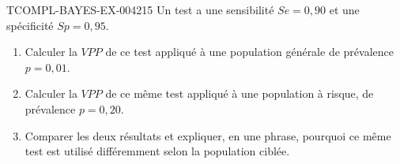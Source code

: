 \begin{exercice}{TCOMPL-BAYES-EX-004}{2}{15}
Un test a une sensibilité $Se=0{,}90$ et une spécificité $Sp=0{,}95$.
\begin{enumerate}
  \item Calculer la $VPP$ de ce test appliqué à une population générale de prévalence $p=0{,}01$.
  \item Calculer la $VPP$ de ce même test appliqué à une population à risque, de prévalence $p=0{,}20$.
  \item Comparer les deux résultats et expliquer, en une phrase, pourquoi ce même test est utilisé différemment selon la population ciblée.
\end{enumerate}
\end{exercice}
